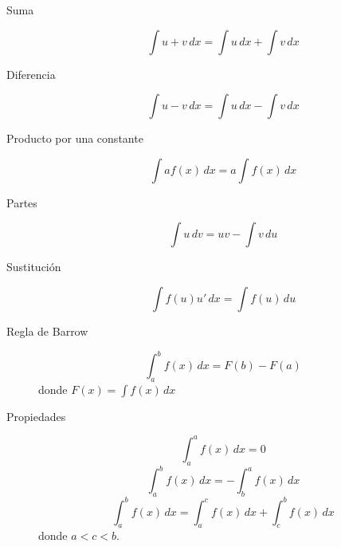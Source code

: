 \begin{multicols}{2}
\begin{tcolorbox}[hbox, title=Reglas de integración]
  \begin{minipage}{0.4\textwidth}
    \begin{description}
      \item[Suma]
      \[
        \int u+v\,dx = \int u\,dx + \int v\,dx
      \]
      \item[Diferencia]
      \[
        \int u-v\,dx = \int u\,dx - \int v\,dx
      \]
      \item[Producto por una constante]
      \[
        \int af(x)\,dx = a\int f(x)\,dx
      \]
      \item[Partes]
      \[
        \int u\,dv = uv - \int v\,du
      \]
      \item[Sustitución]
      \[
        \int f(u)u'\,dx = \int f(u)\,du
      \]
    \end{description}
  \end{minipage}
\end{tcolorbox}

\begin{tcolorbox}[hbox, title=Integrales definidas]
  \begin{minipage}{0.4\textwidth}
    \begin{description}
      \item[Regla de Barrow]
      \[
        \int_a^b f(x)\,dx = F(b)-F(a)
      \]
      donde $F(x) = \int f(x)\,dx$
      \begin{center}
      
      \end{center}
      \item[Propiedades]
      \[
        \int_a^a f(x)\,dx = 0
      \]
      \[
        \int_a^b f(x)\,dx = -\int_b^a f(x)\,dx
      \]
      \[
        \int_a^b f(x)\, dx = \int_a^c f(x)\,dx + \int_c^b f(x)\,dx
      \]
      donde $a<c<b$.
    \end{description}
  \end{minipage}
\end{tcolorbox}
\end{multicols}